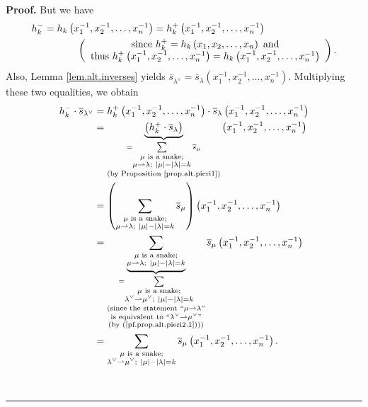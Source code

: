 \documentclass[numbers=enddot,12pt,final,onecolumn,notitlepage]{scrartcl}%
\theoremstyle{definition}
\newenvironment{proof}[1][Proof]{\noindent\textbf{#1.} }{\ \rule{0.5em}{0.5em}}
\let\sumnonlimits\sum
\renewcommand{\sum}{\sumnonlimits\limits}
\newenvironment{verlong}{}{}
\begin{document}
\begin{proof}
\begin{verlong}
But we have
\begin{align*}
h_{k}^{-}  &  =h_{k}\left(  x_{1}^{-1},x_{2}^{-1},\ldots,x_{n}^{-1}\right)
=h_{k}^{+}\left(  x_{1}^{-1},x_{2}^{-1},\ldots,x_{n}^{-1}\right) \\
&  \ \ \ \ \ \ \ \ \ \ \left(
\begin{array}
[c]{c}%
\text{since }h_{k}^{+}=h_{k}\left(  x_{1},x_{2},\ldots,x_{n}\right)  \text{
and}\\
\text{thus }h_{k}^{+}\left(  x_{1}^{-1},x_{2}^{-1},\ldots,x_{n}^{-1}\right)
=h_{k}\left(  x_{1}^{-1},x_{2}^{-1},\ldots,x_{n}^{-1}\right)
\end{array}
\right)  .
\end{align*}
Also, Lemma \ref{lem.alt.inverses} yields $\overline{s}_{\lambda^{\vee}%
}=\overline{s}_{\lambda}\left(  x_{1}^{-1},x_{2}^{-1},\ldots,x_{n}%
^{-1}\right)  $. Multiplying these two equalities, we obtain%
\begin{align*}
h_{k}^{-}\cdot\overline{s}_{\lambda^{\vee}}  &  =h_{k}^{+}\left(  x_{1}%
^{-1},x_{2}^{-1},\ldots,x_{n}^{-1}\right)  \cdot\overline{s}_{\lambda}\left(
x_{1}^{-1},x_{2}^{-1},\ldots,x_{n}^{-1}\right) \\
&  =\underbrace{\left(  h_{k}^{+}\cdot\overline{s}_{\lambda}\right)
}_{\substack{=\sum_{\substack{\mu\text{ is a snake;}\\\mu\rightharpoonup
\lambda;\ \left\vert \mu\right\vert -\left\vert \lambda\right\vert
=k}}\overline{s}_{\mu}\\\text{(by Proposition \ref{prop.alt.pieri1})}}}\left(
x_{1}^{-1},x_{2}^{-1},\ldots,x_{n}^{-1}\right) \\
&  =\left(  \sum_{\substack{\mu\text{ is a snake;}\\\mu\rightharpoonup
\lambda;\ \left\vert \mu\right\vert -\left\vert \lambda\right\vert
=k}}\overline{s}_{\mu}\right)  \left(  x_{1}^{-1},x_{2}^{-1},\ldots,x_{n}%
^{-1}\right) \\
&  =\underbrace{\sum_{\substack{\mu\text{ is a snake;}\\\mu\rightharpoonup
\lambda;\ \left\vert \mu\right\vert -\left\vert \lambda\right\vert =k}%
}}_{\substack{=\sum_{\substack{\mu\text{ is a snake;}\\\lambda^{\vee
}\rightharpoonup\mu^{\vee};\ \left\vert \mu\right\vert -\left\vert
\lambda\right\vert =k}}\\\text{(since the statement \textquotedblleft}%
\mu\rightharpoonup\lambda\text{\textquotedblright}\\\text{is equivalent to
\textquotedblleft}\lambda^{\vee}\rightharpoonup\mu^{\vee}%
\text{\textquotedblright}\\\text{(by (\ref{pf.prop.alt.pieri2.1})))}%
}}\overline{s}_{\mu}\left(  x_{1}^{-1},x_{2}^{-1},\ldots,x_{n}^{-1}\right) \\
&  =\sum_{\substack{\mu\text{ is a snake;}\\\lambda^{\vee}\rightharpoonup
\mu^{\vee};\ \left\vert \mu\right\vert -\left\vert \lambda\right\vert
=k}}\overline{s}_{\mu}\left(  x_{1}^{-1},x_{2}^{-1},\ldots,x_{n}^{-1}\right)
.
\end{align*}


\end{verlong}
\end{proof}
\end{document}
